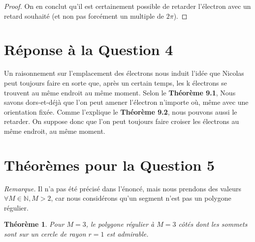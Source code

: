 \documentclass[a4paper]{amsart}
\newtheorem{theorem}{Théorème}[section]
\theoremstyle{definition}
\theoremstyle{remark}
\numberwithin{equation}{section}
\begin{document}
\begin{proof}
  On en conclut qu'il est certainement possible de retarder l'électron avec un retard souhaité (et non pas forcément un multiple de $2\pi$).

\end{proof}

\section{Réponse à la Question 4}


Un raisonnement sur l'emplacement des électrons nous induit l'idée que Nicolas peut toujours faire en sorte que, après un certain temps, les k électrons se trouvent au
même endroit au même moment. Selon le \textbf{Théorème 9.1}, Nous savons dors-et-déjà que l'on peut amener l'électron n'importe où, même avec une orientation fixée. Comme l'explique le \textbf{Théorème 9.2}, nous pouvons aussi 
le retarder. On suppose donc que l'on peut toujours faire croiser les électrons au même endroit, au même moment. 

\section{Théorèmes pour la Question 5}

\textit{Remarque.} Il n'a pas été précisé dans l'énoncé, mais nous prendons des valeurs $\forall M\in\mathbb{N}, M>2$, car nous considérons qu'un segment n'est pas un polygone régulier. 

\begin{theorem}
    Pour $M=3$, le polygone régulier à $M=
    3$ côtés dont les sommets sont sur un cercle de rayon $r=1$ est admirable.
\end{theorem}
\end{document}
